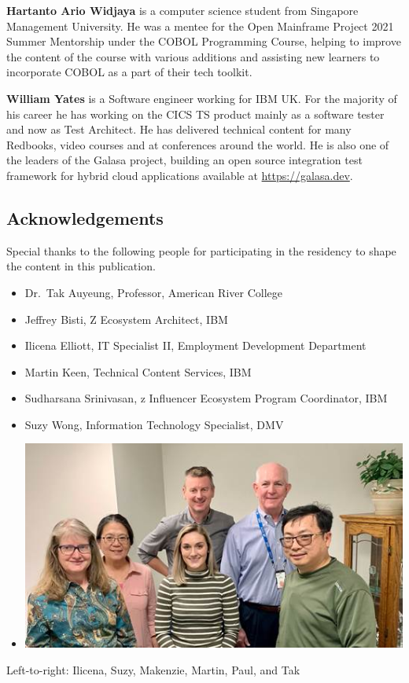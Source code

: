 \textbf{Hartanto Ario Widjaya} is a computer science student from 
Singapore Management University. He was a mentee for the Open Mainframe 
Project 2021 Summer Mentorship under the COBOL Programming Course, 
helping to improve the content of the course with various additions and 
assisting new learners to incorporate COBOL as a part of their tech 
toolkit.

\textbf{William Yates} is a Software engineer working for IBM UK. For
the majority of his career he has working on the CICS TS product mainly
as a software tester and now as Test Architect. He has delivered
technical content for many Redbooks, video courses and at conferences
around the world. He is also one of the leaders of the Galasa project,
building an open source integration test framework for hybrid cloud
applications available at \href{https://galasa.dev/}{https://galasa.dev}.

\hypertarget{acknowledgements}{%
\subsection*{Acknowledgements}\label{acknowledgements}}

Special thanks to the following people for participating in the
residency to shape the content in this publication.

\begin{itemize}
\item
  Dr.~Tak Auyeung, Professor, American River College
\item
  Jeffrey Bisti, Z Ecosystem Architect, IBM
\item
  Ilicena Elliott, IT Specialist II, Employment Development Department
\item
  Martin Keen, Technical Content Services, IBM
\item
  Sudharsana Srinivasan, z Influencer Ecosystem Program Coordinator, IBM
\item
  Suzy Wong, Information Technology Specialist, DMV
\item
  \includegraphics{Images/image004.jpg}
\end{itemize}

Left-to-right: Ilicena, Suzy, Makenzie, Martin, Paul, and Tak
\pagebreak